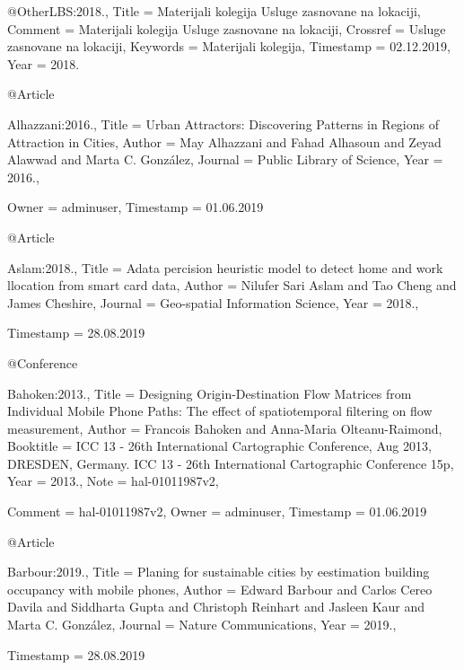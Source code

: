 

@Other{LBS:2018.,
  Title                    = {Materijali kolegija Usluge zasnovane na lokaciji},
  Comment                  = {{Materijali kolegija Usluge zasnovane na lokaciji}},
  Crossref                 = {{Usluge zasnovane na lokaciji}},
  Keywords                 = {Materijali kolegija},
  Timestamp                = {02.12.2019},
  Year                     = {2018.}
}

@Article{Alhazzani:2016.,
  Title                    = {{Urban Attractors: Discovering Patterns in Regions of Attraction in Cities}},
  Author                   = {May Alhazzani and Fahad Alhasoun and Zeyad Alawwad and Marta C. Gonz\'alez},
  Journal                  = {Public Library of Science},
  Year                     = {2016.},

  Owner                    = {adminuser},
  Timestamp                = {01.06.2019}
}

@Article{Aslam:2018.,
  Title                    = {Adata percision heuristic model to detect home and work llocation from smart card data},
  Author                   = {Nilufer Sari Aslam and Tao Cheng and James Cheshire},
  Journal                  = {Geo-spatial Information Science},
  Year                     = {2018.},

  Timestamp                = {28.08.2019}
}

@Conference{Bahoken:2013.,
  Title                    = {{Designing Origin-Destination Flow Matrices from Individual Mobile Phone Paths: The effect of spatiotemporal filtering on flow measurement}},
  Author                   = {Francois Bahoken and Anna-Maria Olteanu-Raimond},
  Booktitle                = {ICC 13 - 26th International Cartographic Conference, Aug 2013, DRESDEN, Germany. ICC 13 - 26th International Cartographic Conference 15p},
  Year                     = {2013.},
  Note                     = {hal-01011987v2},

  Comment                  = {hal-01011987v2},
  Owner                    = {adminuser},
  Timestamp                = {01.06.2019}
}

@Article{Barbour:2019.,
  Title                    = {Planing for sustainable cities by eestimation building occupancy with mobile phones},
  Author                   = {Edward Barbour and Carlos Cereo Davila and Siddharta Gupta and Christoph Reinhart and Jasleen Kaur and Marta C. Gonz\'alez},
  Journal                  = {Nature Communications},
  Year                     = {2019.},

  Timestamp                = {28.08.2019}
}

